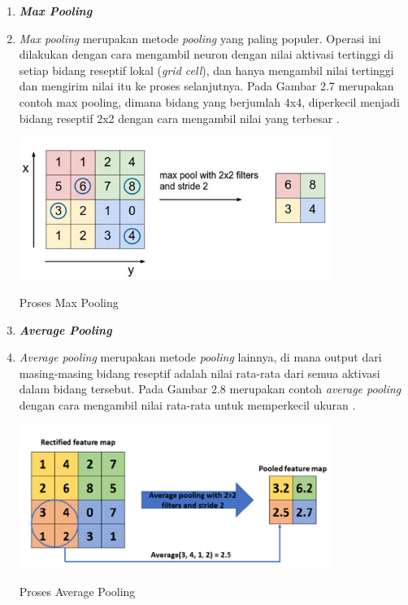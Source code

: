 \begin{enumerate}
        \item \textbf{\textit{Max Pooling}}
        \item[] \textit{Max pooling} merupakan metode \textit{pooling} yang paling populer. Operasi ini dilakukan dengan cara mengambil neuron dengan nilai aktivasi tertinggi di setiap bidang reseptif lokal (\textit{grid cell}), dan hanya mengambil nilai tertinggi dan mengirim nilai itu ke proses selanjutnya. Pada Gambar 2.7 merupakan contoh max pooling, dimana bidang yang berjumlah 4x4, diperkecil menjadi bidang reseptif 2x2 dengan cara mengambil nilai yang terbesar \cite{vasilev2019}.
        \begin{afigure}
            \includegraphics[width=0.8\textwidth, center]{images/Picture7.jpg}
            \caption{Proses Max Pooling}
            \label{fig:max-pooling} 
        \end{afigure}
        \item \textbf{\textit{Average Pooling}}
        \item[] \textit{Average pooling} merupakan metode \textit{pooling} lainnya, di mana output dari masing-masing bidang reseptif adalah nilai rata-rata dari semua aktivasi dalam bidang tersebut. Pada Gambar 2.8 merupakan contoh \textit{average pooling} dengan cara mengambil nilai rata-rata untuk memperkecil ukuran \cite{vasilev2019}.
        \begin{afigure}
            \includegraphics[width=0.8\textwidth, center]{images/Picture8.png}
            \caption{Proses Average Pooling}
            \label{fig:avg-pooling} 
        \end{afigure}
    \end{enumerate}

